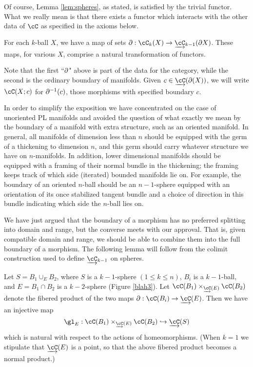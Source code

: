 Of course, Lemma \ref{lem:spheres}, as stated, is satisfied by the trivial functor.
What we really mean is that there exists a functor which interacts with the other data of $\cC$ as specified 
in the axioms below.


\begin{axiom}[Boundaries]\label{nca-boundary}
For each $k$-ball $X$, we have a map of sets $\bd: \cC_k(X)\to \cl{\cC}_{k-1}(\bd X)$.
These maps, for various $X$, comprise a natural transformation of functors.
\end{axiom}

Note that the first ``$\partial$" above is part of the data for the category, 
while the second is the ordinary boundary of manifolds.
Given $c\in\cl{\cC}(\bd(X))$, we will write $\cC(X; c)$ for $\partial^{-1}(c)$, those morphisms with specified boundary $c$.

\medskip

In order to simplify the exposition we have concentrated on the case of 
unoriented PL manifolds and avoided the question of what exactly we mean by 
the boundary of a manifold with extra structure, such as an oriented manifold.
In general, all manifolds of dimension less than $n$ should be equipped with the germ
of a thickening to dimension $n$, and this germ should carry whatever structure we have 
on $n$-manifolds.
In addition, lower dimensional manifolds should be equipped with a framing
of their normal bundle in the thickening; the framing keeps track of which
side (iterated) bounded manifolds lie on.
For example, the boundary of an oriented $n$-ball
should be an $n{-}1$-sphere equipped with an orientation of its once stabilized tangent
bundle and a choice of direction in this bundle indicating
which side the $n$-ball lies on.

\medskip

We have just argued that the boundary of a morphism has no preferred splitting into
domain and range, but the converse meets with our approval.
That is, given compatible domain and range, we should be able to combine them into
the full boundary of a morphism.
The following lemma will follow from the colimit construction used to define $\cl{\cC}_{k-1}$
on spheres.

\begin{lem}
\label{lem:domain-and-range}
Let $S = B_1 \cup_E B_2$, where $S$ is a $k{-}1$-sphere $(1\le k\le n)$,
$B_i$ is a $k{-}1$-ball, and $E = B_1\cap B_2$ is a $k{-}2$-sphere (Figure \ref{blah3}).
Let $\cC(B_1) \times_{\cl{\cC}(E)} \cC(B_2)$ denote the fibered product of the 
two maps $\bd: \cC(B_i)\to \cl{\cC}(E)$.
Then we have an injective map
\[
	\gl_E : \cC(B_1) \times_{\cl{\cC}(E)} \cC(B_2) \into \cl{\cC}(S)
\]
which is natural with respect to the actions of homeomorphisms.
(When $k=1$ we stipulate that $\cl{\cC}(E)$ is a point, so that the above fibered product
becomes a normal product.)
\end{lem}

